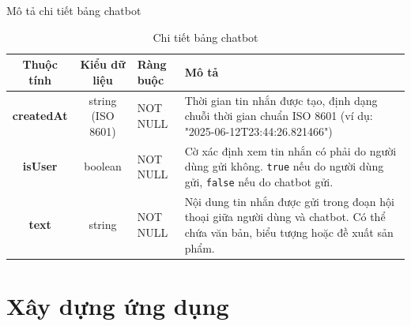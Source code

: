 \documentclass[../DoAn.tex]{subfiles}
\begin{document}
Mô tả chi tiết bảng chatbot
\begin{table}[H]
\centering
\begin{tabular}{|c|c|l|p{7cm}|}
\hline
\textbf{Thuộc tính} & \textbf{Kiểu dữ liệu} & \textbf{Ràng buộc} & \textbf{Mô tả} \\ \hline
\textbf{createdAt} & string (ISO 8601) & NOT NULL & Thời gian tin nhắn được tạo, định dạng chuỗi thời gian chuẩn ISO 8601 (ví dụ: "2025-06-12T23:44:26.821466") \\ \hline
\textbf{isUser} & boolean & NOT NULL & Cờ xác định xem tin nhắn có phải do người dùng gửi không. \texttt{true} nếu do người dùng gửi, \texttt{false} nếu do chatbot gửi. \\ \hline
\textbf{text} & string & NOT NULL & Nội dung tin nhắn được gửi trong đoạn hội thoại giữa người dùng và chatbot. Có thể chứa văn bản, biểu tượng hoặc đề xuất sản phẩm. \\ \hline
\end{tabular}
\caption{Chi tiết bảng chatbot}
\label{tab:chatbotEventsTable}
\end{table}


\section{Xây dựng ứng dụng}
\end{document}
